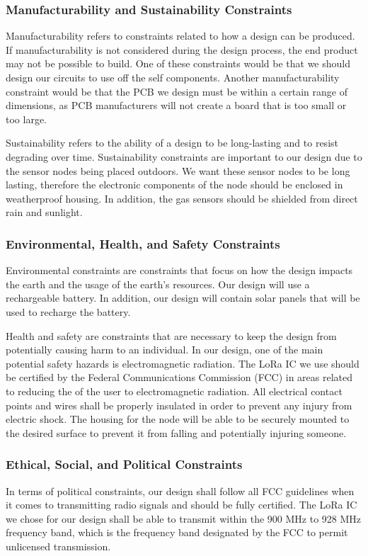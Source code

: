 \subsubsection{Manufacturability and Sustainability Constraints}
Manufacturability refers to constraints related to how a design can be produced. If manufacturability is not considered during the design process, the end product may not be possible to build. One of these constraints would be that we should design our circuits to use off the self components. Another manufacturability constraint would be that the PCB we design must be within a certain range of dimensions, as PCB manufacturers will not create a board that is too small or too large.

Sustainability refers to the ability of a design to be long-lasting and to resist degrading over time. Sustainability constraints are important to our design due to the sensor nodes being placed outdoors. We want these sensor nodes to be long lasting, therefore the electronic components of the node should be enclosed in weatherproof housing. In addition, the gas sensors should be shielded from direct rain and sunlight.

\subsubsection{Environmental, Health, and Safety Constraints}
Environmental constraints are constraints that focus on how the design impacts the earth and the usage of the earth's resources. Our design will use a rechargeable battery. In addition, our design will contain solar panels that will be used to recharge the battery.

Health and safety are constraints that are necessary to keep the design from potentially causing harm to an individual. In our design, one of the main potential safety hazards is electromagnetic radiation. The LoRa IC we use should be certified by the Federal Communications Commission (FCC) in areas related to reducing the of the user to electromagnetic radiation. All electrical contact points and wires shall be properly insulated in order to prevent any injury from electric shock. The housing for the node will be able to be securely mounted to the desired surface to prevent it from falling and potentially injuring someone.

\subsubsection{Ethical, Social, and Political Constraints}
In terms of political constraints, our design shall follow all FCC guidelines when it comes to transmitting radio signals and should be fully certified. The LoRa IC we chose for our design shall be able to transmit within the 900 MHz to 928 MHz frequency band, which is the frequency band designated by the FCC to permit unlicensed transmission.